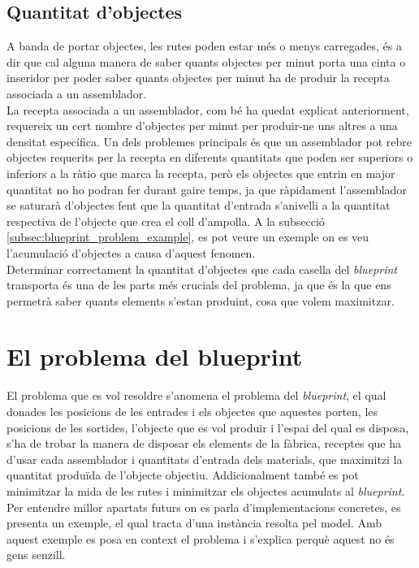 \subsection{Quantitat d'objectes}
A banda de portar objectes, les rutes poden estar més o menys carregades, és a dir que cal alguna manera de saber quants objectes per minut porta una cinta o inseridor per poder saber quants objectes per minut ha de produir la recepta associada a un assemblador.\\
La recepta associada a un assemblador, com bé ha quedat explicat anteriorment, requereix un cert nombre d'objectes per minut per produir-ne uns altres a una densitat específica. Un dels problemes principals és que un assemblador pot rebre objectes requerits per la recepta en diferents quantitats que poden ser superiors o inferiors a la ràtio que marca la recepta, però els objectes que entrin en major quantitat no ho podran fer durant gaire temps, ja que ràpidament l'assemblador se saturarà d'objectes fent que la quantitat d'entrada s'anivelli a la quantitat respectiva de l'objecte que crea el coll d'ampolla. A la subsecció \ref{subsec:blueprint_problem_example}, es pot veure un exemple on es veu l'acumulació d'objectes a causa d'aquest fenomen.\\
Determinar correctament la quantitat d'objectes que cada casella del \textit{blueprint} transporta és una de les parts més crucials del problema, ja que és la que ens permetrà saber quants elements s'estan produint, cosa que volem maximitzar.

\section{El problema del blueprint} \label{sec:blueprint_problem}
El problema que es vol resoldre s'anomena el problema del \textit{blueprint}, el qual donades les posicions de les entrades i els objectes que aquestes porten, les posicions de les sortides, l'objecte que es vol produir i l'espai del qual es disposa, s'ha de trobar la manera de disposar els elements de la fàbrica, receptes que ha d'usar cada assemblador i quantitats d'entrada dels materials, que maximitzi la quantitat produïda de l'objecte objectiu. Addicionalment també es pot minimitzar la mida de les rutes i minimitzar els objectes acumulats al \textit{blueprint}.\\ 
Per entendre millor apartats futurs on es parla d'implementacions concretes, es presenta un exemple, el qual tracta d'una instància resolta pel model. Amb aquest exemple es posa en context el problema i s'explica perquè aquest no és gens senzill.

